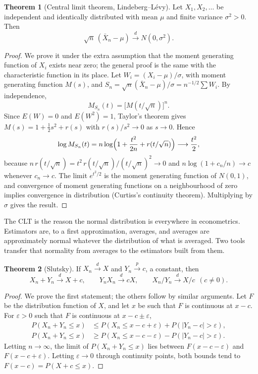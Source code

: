 \documentclass[11pt,a4paper]{article}
\numberwithin{equation}{section}
\theoremstyle{definition}
\newtheorem{thm}{Theorem}[subsection]
\begin{document}
\begin{thm}[Central limit theorem, Lindeberg--L\'evy]
\label{thm:clt}
Let $X_1, X_2, \dots$ be independent and identically distributed with mean $\mu$ and finite variance $\sigma^2 > 0$. Then
\[
\sqrt n\,(\bar X_n - \mu) \xrightarrow{d} N(0, \sigma^2) .
\]
\end{thm}

\begin{proof}
We prove it under the extra assumption that the moment generating function of $X_i$ exists near zero; the general proof is the same with the
characteristic function in its place. Let $W_i = (X_i - \mu)/\sigma$, with moment generating function $M(s)$, and
$S_n = \sqrt n(\bar X_n - \mu)/\sigma = n^{-1/2}\sum W_i$. By independence,
\[
M_{S_n}(t) = \bigl[M(t/\sqrt n)\bigr]^n .
\]
Since $E(W) = 0$ and $E(W^2) = 1$, Taylor's theorem gives $M(s) = 1 + \frac12s^2 + r(s)$ with $r(s)/s^2 \to 0$ as $s \to 0$. Hence
\[
\log M_{S_n}(t) = n\log\Bigl(1 + \frac{t^2}{2n} + r(t/\sqrt n)\Bigr) \longrightarrow \frac{t^2}{2},
\]
because $n\,r(t/\sqrt n) = t^2\,r(t/\sqrt n)/(t/\sqrt n)^2 \to 0$ and $n\log(1 + c_n/n) \to c$ whenever $c_n \to c$. The limit $e^{t^2/2}$ is the moment
generating function of $N(0, 1)$, and convergence of moment generating functions on a neighbourhood of zero implies convergence in distribution
(Curtiss's continuity theorem). Multiplying by $\sigma$ gives the result.
\end{proof}

The CLT is the reason the normal distribution is everywhere in econometrics. Estimators are, to a first approximation, averages, and averages
are approximately normal whatever the distribution of what is averaged. Two tools transfer that normality from averages to the estimators
built from them.

\begin{thm}[Slutsky]
\label{thm:slutsky}
If $X_n \xrightarrow{d} X$ and $Y_n \xrightarrow{p} c$, a constant, then
\[
X_n + Y_n \xrightarrow{d} X + c, \qquad Y_nX_n \xrightarrow{d} cX, \qquad X_n/Y_n \xrightarrow{d} X/c \ \ (c \neq 0) .
\]
\end{thm}

\begin{proof}
We prove the first statement; the others follow by similar arguments. Let $F$ be the distribution function of $X$, and let $x$ be such that $F$ is
continuous at $x - c$. For $\varepsilon > 0$ such that $F$ is continuous at $x - c \pm \varepsilon$,
\begin{align*}
P(X_n + Y_n \leq x) &\leq P(X_n \leq x - c + \varepsilon) + P(|Y_n - c| > \varepsilon),\\
P(X_n + Y_n \leq x) &\geq P(X_n \leq x - c - \varepsilon) - P(|Y_n - c| > \varepsilon) .
\end{align*}
Letting $n \to \infty$, the limit of $P(X_n + Y_n \leq x)$ lies between $F(x - c - \varepsilon)$ and $F(x - c + \varepsilon)$. Letting $\varepsilon \to 0$ through
continuity points, both bounds tend to $F(x - c) = P(X + c \leq x)$.
\end{proof}
\end{document}
